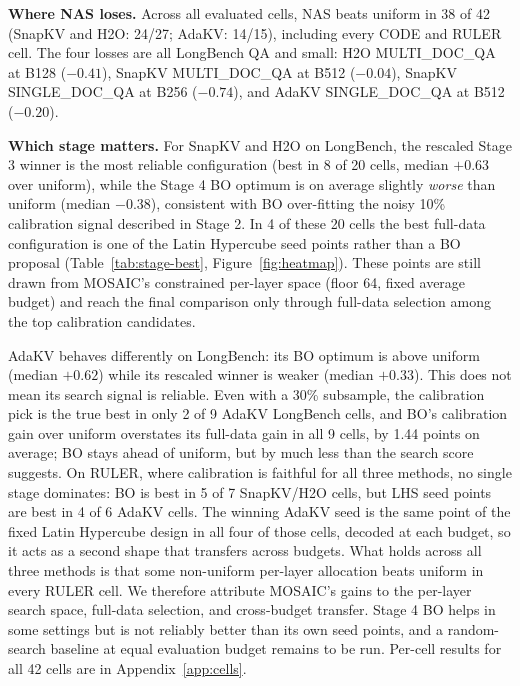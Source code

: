\documentclass[11pt]{article}
\begin{document}
\textbf{Where NAS loses.} Across all evaluated cells, NAS beats uniform in 38 of 42 (SnapKV and H2O: 24/27; AdaKV: 14/15), including every CODE and RULER cell. The four losses are all LongBench QA and small: H2O MULTI\_DOC\_QA at B128 ($-0.41$), SnapKV MULTI\_DOC\_QA at B512 ($-0.04$), SnapKV SINGLE\_DOC\_QA at B256 ($-0.74$), and AdaKV SINGLE\_DOC\_QA at B512 ($-0.20$).

\textbf{Which stage matters.} For SnapKV and H2O on LongBench, the rescaled Stage 3 winner is the most reliable configuration (best in 8 of 20 cells, median $+0.63$ over uniform), while the Stage 4 BO optimum is on average slightly \emph{worse} than uniform (median $-0.38$), consistent with BO over-fitting the noisy 10\% calibration signal described in Stage 2. In 4 of these 20 cells the best full-data configuration is one of the Latin Hypercube seed points rather than a BO proposal (Table~\ref{tab:stage-best}, Figure~\ref{fig:heatmap}). These points are still drawn from MOSAIC's constrained per-layer space (floor 64, fixed average budget) and reach the final comparison only through full-data selection among the top calibration candidates.

AdaKV behaves differently on LongBench: its BO optimum is above uniform (median $+0.62$) while its rescaled winner is weaker (median $+0.33$). This does not mean its search signal is reliable. Even with a 30\% subsample, the calibration pick is the true best in only 2 of 9 AdaKV LongBench cells, and BO's calibration gain over uniform overstates its full-data gain in all 9 cells, by 1.44 points on average; BO stays ahead of uniform, but by much less than the search score suggests. On RULER, where calibration is faithful for all three methods, no single stage dominates: BO is best in 5 of 7 SnapKV/H2O cells, but LHS seed points are best in 4 of 6 AdaKV cells. The winning AdaKV seed is the same point of the fixed Latin Hypercube design in all four of those cells, decoded at each budget, so it acts as a second shape that transfers across budgets. What holds across all three methods is that some non-uniform per-layer allocation beats uniform in every RULER cell. We therefore attribute MOSAIC's gains to the per-layer search space, full-data selection, and cross-budget transfer. Stage 4 BO helps in some settings but is not reliably better than its own seed points, and a random-search baseline at equal evaluation budget remains to be run. Per-cell results for all 42 cells are in Appendix~\ref{app:cells}.
\end{document}
